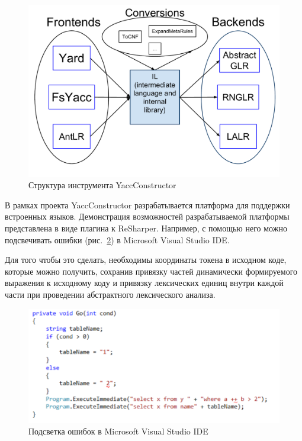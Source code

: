 \begin{itemize}
\begin{figure}[t]
\centering
\includegraphics[width=\textwidth]{Polubelova/YC_base}
\caption{Структура инструмента YaccConstructor}
\label{fig:YC_base} 
\end{figure}


В рамках проекта YaccConstructor разрабатывается платформа для поддержки встроенных языков. Демонстрация возможностей разрабатываемой платформы 
представлена в виде плагина к ReSharper. Например, с помощью него можно подсвечивать ошибки (рис.~\ref{fig:ReSharper}) в Microsoft Visual Studio IDE. 

Для того чтобы это сделать, необходимы координаты токена в исходном коде, которые можно получить, сохранив привязку частей динамически формируемого
выражения к исходному коду и привязку лексических единиц внутри каждой части при проведении абстрактного лексического анализа.

\begin{figure}[t]
\centering
\includegraphics[width=\textwidth]{Polubelova/ReSharper}
\caption{Подсветка ошибок в Microsoft Visual Studio IDE}
\label{fig:ReSharper} 
\end{figure}
\end{itemize}


